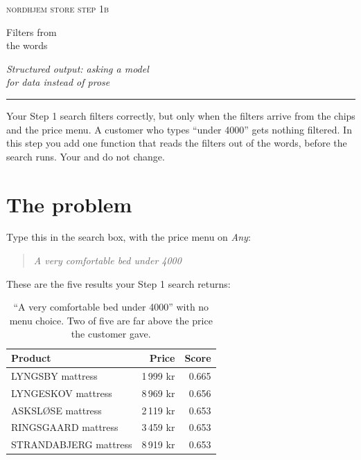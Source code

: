 \documentclass[11pt]{article}
\begin{document}
\thispagestyle{empty}
\setlength{\parindent}{0pt}
\vspace*{1.2cm}
{\color{muted}\scshape\MakeLowercase{Nordhjem store}
  \textperiodcentered{} \MakeLowercase{Step 1b}}\par
\vspace{0.9cm}
{\fontsize{28}{32}\selectfont Filters from\\[2pt] the words\par}
\vspace{0.5cm}
{\large\itshape\color{muted} Structured output: asking a model\\
  for data instead of prose\par}
\vspace{0.6cm}
{\color{accent}\rule{2.2cm}{1.2pt}}\par
\vspace{0.6cm}
\begin{minipage}{11.5cm}
\small\color{muted}
Your Step 1 search filters correctly, but only when the filters
arrive from the chips and the price menu. A customer who types
``under 4000'' gets nothing filtered. In this step you add one function
that reads the filters out of the words, before the search runs.
Your  and  do not change.
\end{minipage}
\vspace{1.0cm}

{\small
\renewcommand{\contentsname}{\normalsize\scshape\color{muted}
  \MakeLowercase{Contents}}
\tableofcontents}

\newpage
\setlength{\parindent}{1.2em}

\section{The problem}

Type this in the search box, with the price menu on \emph{Any}:
\begin{quote}\itshape
A very comfortable bed under 4000
\end{quote}
These are the five results your Step 1 search returns:

\begin{table}[H]
\small
\begin{tabularx}{\textwidth}{@{}X r r@{}}
\toprule
Product & Price & Score \\
\midrule
LYNGSBY mattress & 1\,999 kr & 0.665 \\
LYNGESKOV mattress & \textcolor{accent}{8\,969 kr} & 0.656 \\
ASKSLØSE mattress & 2\,119 kr & 0.653 \\
RINGSGAARD mattress & 3\,459 kr & 0.653 \\
STRANDABJERG mattress & \textcolor{accent}{8\,919 kr} & 0.653 \\
\bottomrule
\end{tabularx}
\caption{``A very comfortable bed under 4000'' with no menu choice.
Two of five are far above the price the customer gave.}
\end{table}
\end{document}

